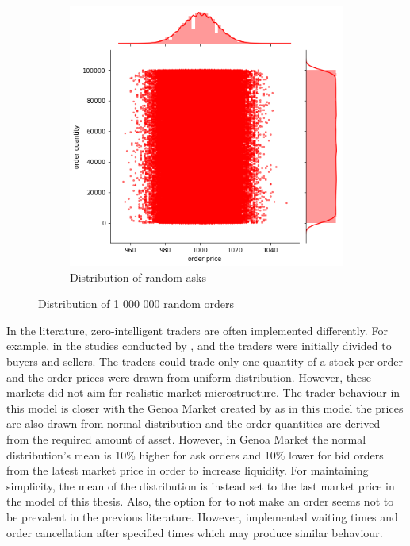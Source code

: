\begin{figure}
\begin{subfigure}{.5\textwidth}
      \includegraphics[width=\linewidth]{plots/order_distr_ask.png}
      \caption{Distribution of random asks}
      \label{fig:gener_asks}
    \end{subfigure}
    \caption{Distribution of 1 000 000 random orders}
    \label{fig:generated_orders}
\end{figure}



In the literature, zero-intelligent traders are often implemented differently. For example, in the studies conducted by 
\citet{God93}, \citet{Jam96} and \citet{Mil08} the traders were initially divided to buyers and 
sellers. The traders could trade only one quantity of a stock per order and the order prices 
were drawn from uniform distribution. However, these markets did not aim for 
realistic market microstructure. The trader behaviour in this model is closer with the Genoa Market 
created by \citet{Genoa01} as in this model the prices are also drawn from normal distribution and 
the order quantities are derived from the required amount of asset. However, in Genoa Market the 
normal distribution's mean is 10\% higher for ask orders and 10\% lower for bid orders from the 
latest market price in order to increase liquidity. For maintaining simplicity, the mean of the distribution 
is instead set to the last market price in the model of this thesis. Also, the option for to not make an order 
seems not to be prevalent in the previous literature. However, \citet{Raberto05} implemented waiting times and order 
cancellation after specified times which may produce similar behaviour. 

